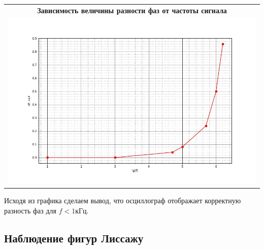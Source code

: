 \documentclass[a4paper,12pt]{article}
\begin{document}
	\begin{center}
	\begin{tabular}{c}
		
	\bfseries{	Зависимость величины разности фаз от частоты сигнала  }\\ 
		\includegraphics[width=1.0\linewidth]{gr5.jpg}\\
		
	\end{tabular}
\end{center}

Исходя из графика сделаем вывод, что осциллограф отображает корректную разность фаз для $f  < 1кГц$.


	\subsection*{Наблюдение фигур Лиссажу}
\end{document}
